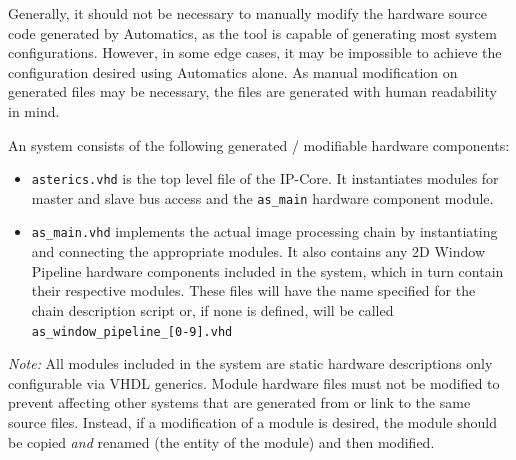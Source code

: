 Generally, it should not be necessary to manually modify the hardware source code generated by Automatics, as the tool is capable of generating most system configurations.
However, in some edge cases, it may be impossible to achieve the configuration desired using Automatics alone.
As manual modification on generated files may be necessary, the files are generated with human readability in mind.

An \asterics system consists of the following generated / modifiable hardware components:
\begin{itemize}
  \item \texttt{asterics.vhd} is the top level file of the \asterics IP-Core. It instantiates modules for master and slave bus access and the \texttt{as\_main} hardware component module.
  \item \texttt{as\_main.vhd} implements the actual image processing chain by instantiating and connecting the appropriate \asterics modules.
  	It also contains any 2D Window Pipeline hardware components included in the system, which in turn contain their respective \asterics modules.
  	These files will have the name specified for the chain description script or, if none is defined, will be called \texttt{as\_window\_pipeline\_[0-9].vhd}
\end{itemize}

\emph{Note:}
All \asterics modules included in the system are static hardware descriptions only configurable via VHDL generics.
Module hardware files must not be modified to prevent affecting other \asterics systems that are generated from or link to the same source files.
Instead, if a modification of a module is desired, the module should be copied \emph{and} renamed (the entity of the module) and then modified.



